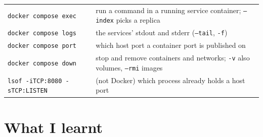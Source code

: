 \documentclass[11pt,a4paper]{article}
\begin{document}
\begin{table}[H]
\begin{tabularx}{\linewidth}{@{}lL@{}}
\texttt{docker compose exec} & run a command in a running service container; \texttt{--index} picks a replica \\
\texttt{docker compose logs} & the services' stdout and stderr (\texttt{--tail}, \texttt{-f}) \\
\texttt{docker compose port} & which host port a container port is published on \\
\texttt{docker compose down} & stop and remove containers and networks; \texttt{-v} also volumes, \texttt{--rmi} images \\
\midrule
\texttt{lsof -iTCP:8080 -sTCP:LISTEN} & (not Docker) which process already holds a host port \\
\bottomrule
\end{tabularx}
\end{table}

\section{What I learnt}
\end{document}
